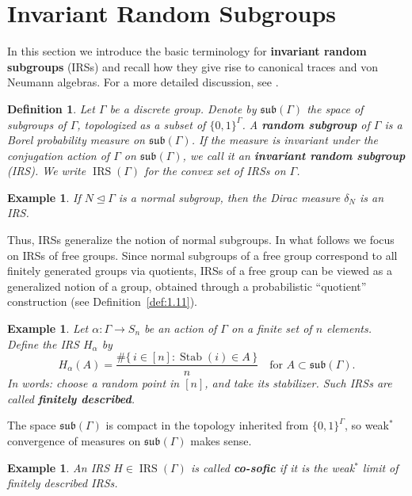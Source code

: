 \documentclass[pdflatex,sn-mathphys-num]{sn-jnl}%
\newtheorem{definition}[theorem]{Definition}
\newtheorem{example}[theorem]{Example}
\newcommand{\sub}{\mathfrak{sub}}
\newcommand{\IRS}{\operatorname{IRS}}
\DeclareMathOperator{\Stab}{Stab}
\begin{document}
\section{Invariant Random Subgroups}\label{sec:2}

In this section we introduce the basic terminology for \textbf{invariant random subgroups} (IRSs) and recall how they give rise to canonical traces and von Neumann algebras. 
For a more detailed discussion, see \cite[Section~2]{manzoor_there_2025}.

\begin{definition}
    Let $\Gamma$ be a discrete group.  
    Denote by $\sub(\Gamma)$ the space of subgroups of $\Gamma$, topologized as a subset of $\{0,1\}^\Gamma$.  
    A \textbf{random subgroup} of $\Gamma$ is a Borel probability measure on $\sub(\Gamma)$.  
    If the measure is invariant under the conjugation action of $\Gamma$ on $\sub(\Gamma)$, we call it an \textbf{invariant random subgroup} (IRS).  
    We write $\IRS(\Gamma)$ for the convex set of IRSs on $\Gamma$.
\end{definition}

\begin{example}
    If $N \trianglelefteq \Gamma$ is a normal subgroup, then the Dirac measure $\delta_N$ is an IRS.
\end{example}

Thus, IRSs generalize the notion of normal subgroups.  
In what follows we focus on IRSs of free groups.  
Since normal subgroups of a free group correspond to all finitely generated groups via quotients, IRSs of a free group can be viewed as a generalized notion of a group, obtained through a probabilistic ``quotient'' construction (see Definition~\ref{def:1.11}).

\begin{example}
    Let $\alpha \colon \Gamma \to S_n$ be an action of $\Gamma$ on a finite set of $n$ elements.  
    Define the IRS $H_\alpha$ by
    \[
        H_\alpha(A) = \frac{\#\{\,i \in [n] : \Stab(i) \in A \,\}}{n} \quad \text{for } A \subset \sub(\Gamma).
    \]
    In words: choose a random point in $[n]$, and take its stabilizer.  
    Such IRSs are called \textbf{finitely described}.
\end{example}

The space $\sub(\Gamma)$ is compact in the topology inherited from $\{0,1\}^\Gamma$, so weak$^*$ convergence of measures on $\sub(\Gamma)$ makes sense.

\begin{example}
    An IRS $H \in \IRS(\Gamma)$ is called \textbf{co-sofic} if it is the weak$^*$ limit of finitely described IRSs.
\end{example}
\end{document}
